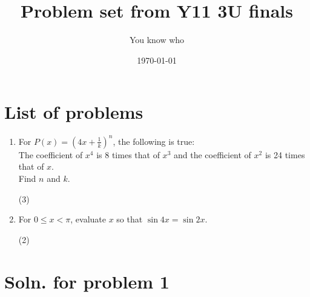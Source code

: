\documentclass[12pt]{article}
\author{\normalsize You know who}
\title{\huge Problem set from Y11 3U finals}
\date{\today}
\begin{document}
\maketitle
\section*{List of problems}
\large

\begin{enumerate}
	\item For $P(x) = (4x + \frac{1}{k})^n$, the following is true: \\
	      The coefficient of $x^4$ is 8 times that of $x^3$ and the coefficient of $x^2$ is 24 times that of $x$. \\
	      Find $n$ and $k$. \begin{flushright} (3) \end{flushright}

	\item For $0\leq x<\pi$, evaluate $x$ so that $\sin{4x} = \sin{2x}$. \begin{flushright} (2) \end{flushright}
\end{enumerate}

\newpage

\section*{Soln. for problem 1}
\normalsize
\end{document}
